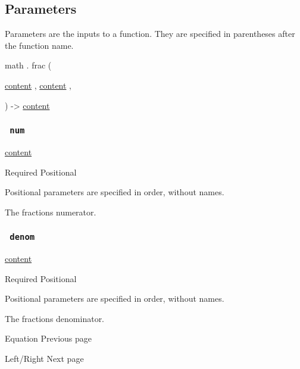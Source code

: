 \subsection{\texorpdfstring{{ Parameters
}}{ Parameters }}\label{parameters}

\label{parameters-tooltip}
Parameters are the inputs to a function. They are specified in
parentheses after the function name.

math { . } { frac } (

{ \href{/docs/reference/foundations/content/}{content} , } {
\href{/docs/reference/foundations/content/}{content} , }

) -\textgreater{} \href{/docs/reference/foundations/content/}{content}

\subsubsection{\texorpdfstring{\texttt{\ num\ }}{ num }}\label{parameters-num}

\href{/docs/reference/foundations/content/}{content}

{Required} {{ Positional }}

\label{parameters-num-positional-tooltip}
Positional parameters are specified in order, without names.

The fraction\textquotesingle s numerator.

\subsubsection{\texorpdfstring{\texttt{\ denom\ }}{ denom }}\label{parameters-denom}

\href{/docs/reference/foundations/content/}{content}

{Required} {{ Positional }}

\label{parameters-denom-positional-tooltip}
Positional parameters are specified in order, without names.

The fraction\textquotesingle s denominator.

\href{/docs/reference/math/equation/}{\pandocbounded{}}

{ Equation } { Previous page }

\href{/docs/reference/math/lr/}{\pandocbounded{}}

{ Left/Right } { Next page }
